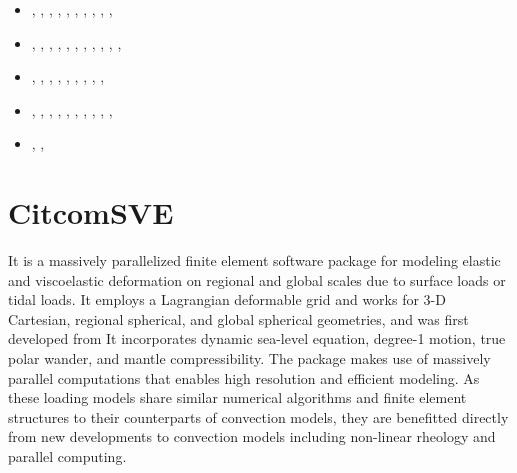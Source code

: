 \begin{small}
\begin{itemize}
\item[\twothousandtwenty]    \textcite{weki20},  \textcite{braf20},  \textcite{pagh20},
                             \textcite{vamg20},  \textcite{heyg20},  \textcite{loru20}, 
                             \textcite{bill20},  \textcite{sele20},
                             \textcite{dazl20},  \textcite{wali20}, 
\item[\twothousandtwentyone] \textcite{cafm21},  \textcite{ligl21},  \textcite{lule21},
                             \textcite{scvg21},  \textcite{ligl21b}, \textcite{maba21},
                             \textcite{wali21},  \textcite{cafb21},  \textcite{mazh21a}
                             \textcite{hulg21},  \textcite{moma21},  \textcite{sabp21},
                             \textcite{mazh21b}
\item[\twothousandtwentytwo] \textcite{limc22},  \textcite{scva22},  \textcite{yuli22},
                             \textcite{flbw22},  \textcite{kibm22},  \textcite{rojy22},
                             \textcite{ghpa22},  \textcite{maba22},  \textcite{peli22},
                             \textcite{fube22}
\item[\twothousandtwentythree] \textcite{li__23}, \textcite{lilz23}, \textcite{bofl23},
                               \textcite{hagl23}, \textcite{wacp23}, \textcite{lilw23},
                               \textcite{zhzl23}, \textcite{li__23}, \textcite{befu23},
                               \textcite{pacb23}, \textcite{tumk23}
\item[\twothousandtwentyfour]  \textcite{bero24}, \textcite{lobb24}, \textcite{muki24}
\end{itemize}
\end{small}


\section{CitcomSVE} 

It is a massively parallelized finite element software package for modeling elastic 
and viscoelastic deformation on regional and global scales due to 
surface loads or tidal loads. 
It employs a Lagrangian deformable grid and works for 3-D Cartesian, 
regional spherical, and global spherical geometries, and was first developed from \citcoms
It incorporates dynamic sea-level equation, degree-1 motion, true polar wander, 
and mantle compressibility. The package makes use of massively parallel computations 
that enables high resolution and efficient modeling. 
As these loading models share similar numerical algorithms and finite element 
structures to their counterparts of convection models, they are benefitted directly 
from new developments to convection models including non-linear rheology and parallel computing. 

